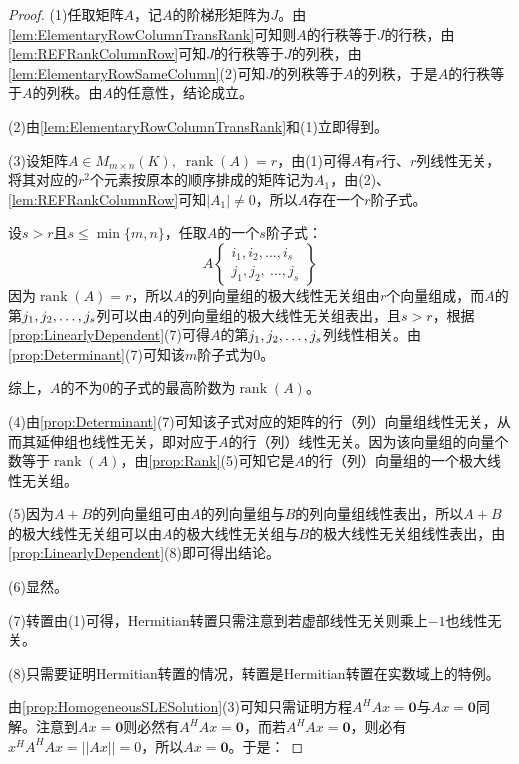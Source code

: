\begin{proof}
	(1)任取矩阵$A$，记$A$的阶梯形矩阵为$J$。由\cref{lem:ElementaryRowColumnTransRank}可知则$A$的行秩等于$J$的行秩，由\cref{lem:REFRankColumnRow}可知$J$的行秩等于$J$的列秩，由\cref{lem:ElementaryRowSameColumn}(2)可知$J$的列秩等于$A$的列秩，于是$A$的行秩等于$A$的列秩。由$A$的任意性，结论成立。\par
	(2)由\cref{lem:ElementaryRowColumnTransRank}和(1)立即得到。\par
	(3)设矩阵$A\in M_{m\times n}(K),\;\operatorname{rank}(A)=r$，由(1)可得$A$有$r$行、$r$列线性无关，将其对应的$r^2$个元素按原本的顺序排成的矩阵记为$A_1$，由(2)、\cref{lem:REFRankColumnRow}可知$|A_1|\ne0$，所以$A$存在一个$r$阶子式。\par
	设$s>r$且$s\leqslant\min\{m,n\}$，任取$A$的一个$s$阶子式：
	\begin{equation*}
		A\left\{ \begin{array}{l}
			i_1,i_2,\dots,i_s \\
			j_1,j_2,\ \dots,j_s
		\end{array}\right\}
	\end{equation*}
	因为$\operatorname{rank}(A)=r$，所以$A$的列向量组的极大线性无关组由$r$个向量组成，而$A$的第$j_1, j_2, \dots, j_{s}$列可以由$A$的列向量组的极大线性无关组表出，且$s>r$，根据\cref{prop:LinearlyDependent}(7)可得$A$的第$j_1, j_2, \dots, j_{s}$列线性相关。由\cref{prop:Determinant}(7)可知该$m$阶子式为$0$。\par
	综上，$A$的不为$0$的子式的最高阶数为$\operatorname{rank}(A)$。\par
	(4)由\cref{prop:Determinant}(7)可知该子式对应的矩阵的行（列）向量组线性无关，从而其延伸组也线性无关，即对应于$A$的行（列）线性无关。因为该向量组的向量个数等于$\operatorname{rank}(A)$，由\cref{prop:Rank}(5)可知它是$A$的行（列）向量组的一个极大线性无关组。\par
	(5)因为$A+B$的列向量组可由$A$的列向量组与$B$的列向量组线性表出，所以$A+B$的极大线性无关组可以由$A$的极大线性无关组与$B$的极大线性无关组线性表出，由\cref{prop:LinearlyDependent}(8)即可得出结论。\par
	(6)显然。\par
	(7)转置由(1)可得，Hermitian转置只需注意到若虚部线性无关则乘上$-1$也线性无关。\par
	(8)只需要证明Hermitian转置的情况，转置是Hermitian转置在实数域上的特例。\par
	由\cref{prop:HomogeneousSLESolution}(3)可知只需证明方程$A^HAx=\mathbf{0}$与$Ax=\mathbf{0}$同解。注意到$Ax=\mathbf{0}$则必然有$A^HAx=\mathbf{0}$，而若$A^HAx=\mathbf{0}$，则必有$x^HA^HAx=||Ax||=0$，所以$Ax=\mathbf{0}$。于是：

\end{proof}
